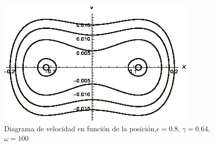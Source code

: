 \begin{figure}[H]
    \centering
    \includegraphics[scale=1]{imagenes/fase-clasico2.png}
    \caption{Diagrama de velocidad en función de la posición,$\epsilon=0.8$, $\gamma=0.64$, $\omega=100$ }
    \label{fig:9.2}
\end{figure}
